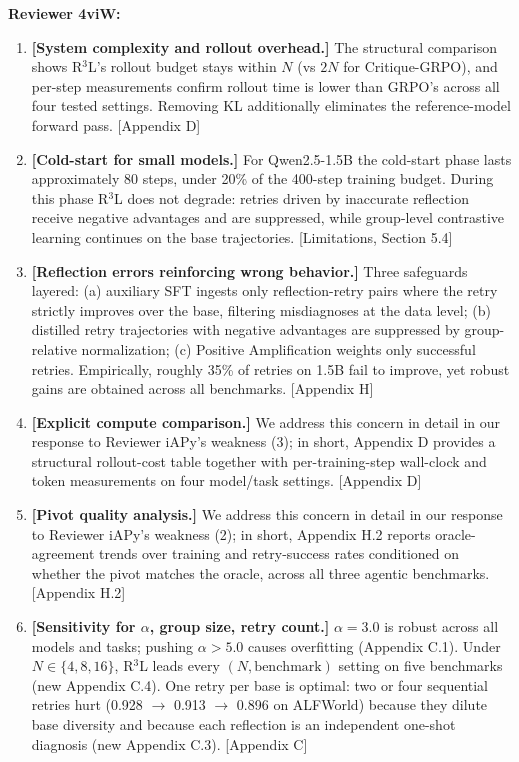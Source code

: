 \documentclass[11pt]{article}
\begin{document}
\noindent \textbf{Reviewer 4viW:}
\begin{enumerate}[label=(\arabic*), itemsep=2pt]
    \item \textbf{[System complexity and rollout overhead.]} The structural comparison shows R$^3$L's rollout budget stays within $N$ (vs $2N$ for Critique-GRPO), and per-step measurements confirm rollout time is lower than GRPO's across all four tested settings. Removing KL additionally eliminates the reference-model forward pass. [Appendix D]

    \item \textbf{[Cold-start for small models.]} For Qwen2.5-1.5B the cold-start phase lasts approximately 80 steps, under 20\% of the 400-step training budget. During this phase R$^3$L does not degrade: retries driven by inaccurate reflection receive negative advantages and are suppressed, while group-level contrastive learning continues on the base trajectories. [Limitations, Section 5.4]

    \item \textbf{[Reflection errors reinforcing wrong behavior.]} Three safeguards layered: (a) auxiliary SFT ingests only reflection-retry pairs where the retry strictly improves over the base, filtering misdiagnoses at the data level; (b) distilled retry trajectories with negative advantages are suppressed by group-relative normalization; (c) Positive Amplification weights only successful retries. Empirically, roughly 35\% of retries on 1.5B fail to improve, yet robust gains are obtained across all benchmarks. [Appendix H]

    \item \textbf{[Explicit compute comparison.]} We address this concern in detail in our response to Reviewer iAPy's weakness (3); in short, Appendix D provides a structural rollout-cost table together with per-training-step wall-clock and token measurements on four model/task settings. [Appendix D]

    \item \textbf{[Pivot quality analysis.]} We address this concern in detail in our response to Reviewer iAPy's weakness (2); in short, Appendix H.2 reports oracle-agreement trends over training and retry-success rates conditioned on whether the pivot matches the oracle, across all three agentic benchmarks. [Appendix H.2]

    \item \textbf{[Sensitivity for $\alpha$, group size, retry count.]} $\alpha = 3.0$ is robust across all models and tasks; pushing $\alpha > 5.0$ causes overfitting (Appendix C.1). Under $N \in \{4, 8, 16\}$, R$^3$L leads every $(N, \text{benchmark})$ setting on five benchmarks (new Appendix C.4). One retry per base is optimal: two or four sequential retries hurt (0.928 $\to$ 0.913 $\to$ 0.896 on ALFWorld) because they dilute base diversity and because each reflection is an independent one-shot diagnosis (new Appendix C.3). [Appendix C]
\end{enumerate}
\end{document}
